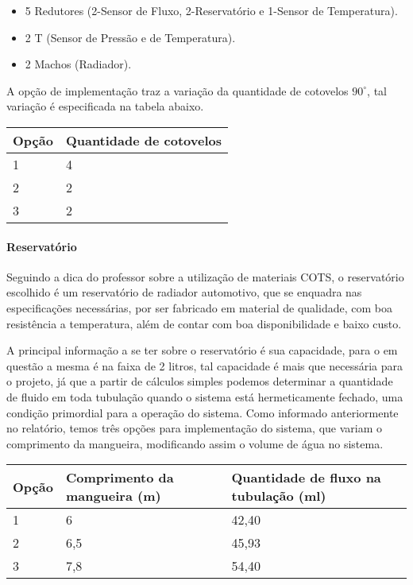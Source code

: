 \begin{itemize}
\item 5 Redutores (2-Sensor de Fluxo, 2-Reservatório e 1-Sensor de Temperatura).
\item 2 T (Sensor de Pressão e de Temperatura).
\item 2 Machos (Radiador).
\end{itemize}

A opção de implementação traz a variação da quantidade de cotovelos $90^{\circ}$, tal variação é especificada na tabela abaixo.

\begin{table}[htb]
\centering
\begin{tabular}{|p{2cm}|p{2cm}|}
\hline
Opção & Quantidade de cotovelos \\
\hline
1 & 4 \\ \hline
2 & 2 \\ \hline
3 & 2 \\ \hline
\hline
\end{tabular}
\end{table}

\paragraph{Reservatório}

Seguindo a dica do professor sobre a utilização de materiais COTS, o reservatório escolhido é um reservatório de radiador automotivo, que se enquadra nas especificações necessárias, por ser fabricado em material de qualidade, com boa resistência a temperatura, além de contar com boa disponibilidade e baixo custo.

A principal informação a se ter sobre o reservatório é sua capacidade, para o em questão a mesma é na faixa de 2 litros, tal capacidade é mais que necessária para o projeto, já que a partir de cálculos simples podemos determinar a quantidade de fluido em toda tubulação quando o sistema está hermeticamente fechado, uma condição primordial para a operação do sistema. Como informado anteriormente no relatório, temos três opções para implementação do sistema, que variam o comprimento da mangueira, modificando assim o volume de água no sistema.

\begin{table}[htb]
\centering
\begin{tabular}{|p{2cm}|p{2cm}|p{3cm}|}
\hline
Opção & Comprimento da mangueira (m) & Quantidade de fluxo na tubulação (ml) \\
\hline
1 & 6 & 42,40 \\ \hline
2 & 6,5 & 45,93 \\ \hline
3 & 7,8 & 54,40 \\ \hline
\hline
\end{tabular}
\end{table}

